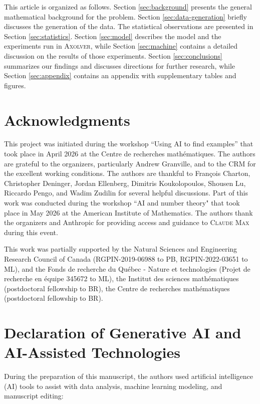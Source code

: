 \documentclass[12pt]{amsart}%
\newcommand{\1}{\mathds{1}}
\theoremstyle{definition}
\numberwithin{equation}{section}
\numberwithin{table}{section}
\numberwithin{figure}{section}
\begin{document}
This article is organized as follows.
Section \ref{sec:background} presents the general mathematical background for the problem. Section \ref{sec:data-generation} briefly discusses the generation of the data. The statistical observations are presented in Section \ref{sec:statistics}. Section \ref{sec:model} describes the model and the experiments run in \textsc{Axolver}, while  Section \ref{sec:machine} contains a detailed discussion on the results of those experiments. Section \ref{sec:conclusions} summarizes our findings and discusses directions for further research, while Section \ref{sec:appendix} contains an appendix with supplementary tables and figures.

\section*{Acknowledgments} This project was initiated during the workshop ``Using AI to find examples'' that took place in April 2026 at the Centre de recherches math\'ematiques. The authors are grateful to the organizers, particularly Andrew Granville, and to the CRM for the excellent working conditions. The authors are thankful to Fran\c cois Charton, Christopher Deninger, Jordan Ellenberg, Dimitris Koukolopoulos,  Shousen Lu, Riccardo Pengo, and Wadim Zudilin for several helpful discussions. Part of this work was conducted during the workshop ``AI and number theory" that took place in May 2026 at the American Institute of Mathematics. The authors thank the organizers and Anthropic for providing access and guidance to \textsc{Claude Max} during this event.

This work was partially supported by the Natural Sciences and Engineering Research Council of Canada (RGPIN-2019-06988 to PB, RGPIN-2022-03651 to ML), and the Fonds de recherche du Qu\'ebec - Nature et technologies (Projet de recherche en \'equipe 345672 to ML), the  Institut des sciences math\'ematiques (postdoctoral fellowship to BR),  the Centre de recherches math\'ematiques (postdoctoral fellowship to BR).


\section*{Declaration of Generative AI and AI-Assisted Technologies} During the preparation of this manuscript, the authors used artificial intelligence (AI) tools to assist with data analysis, machine learning modeling, and manuscript editing:
\end{document}
